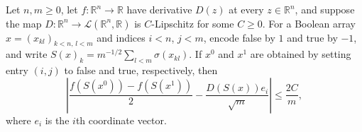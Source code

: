 \begin{lemma}
\leanok
{}
Let $n,m\ge0$, let $f\colon\mathbb R^n\to\mathbb R$ have derivative $D(z)$ at every
$z\in\mathbb R^n$, and suppose the map $D\colon\mathbb R^n\to\mathcal L(\mathbb
R^n,\mathbb R)$ is $C$-Lipschitz for some $C\ge0$. For a Boolean array
$x=(x_{kl})_{k<n,\,l<m}$ and indices $i<n$, $j<m$, encode false by $1$ and true by $-1$,
and write $S(x)_k=m^{-1/2}\sum_{l<m}\sigma(x_{kl})$. If $x^{0}$ and $x^{1}$ are obtained
by setting entry $(i,j)$ to false and true, respectively, then
\[\left|\frac{f(S(x^{0}))-f(S(x^{1}))}{2}-\frac{D(S(x))e_i}{\sqrt m}\right|\le\frac{2C}{m},\]
where $e_i$ is the $i$th coordinate vector.
\end{lemma}
